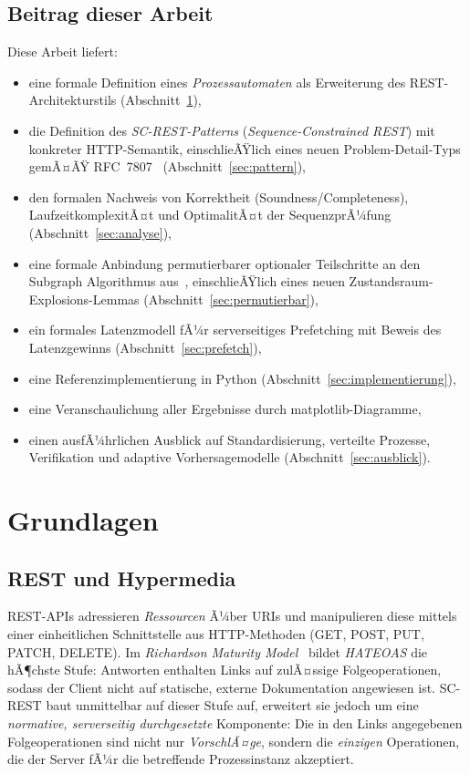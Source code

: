﻿\documentclass[a4paper,12pt]{article}
\theoremstyle{definition}
\begin{document}
\subsection{Beitrag dieser Arbeit}

Diese Arbeit liefert:
\begin{itemize}
	\item eine formale Definition eines \emph{Prozessautomaten} als Erweiterung des
	      REST-Architekturstils (Abschnitt~\ref{sec:grundlagen}),
	\item die Definition des \emph{SC-REST-Patterns} (\emph{Sequence-Constrained REST})
	      mit konkreter HTTP-Semantik, einschlieÃŸlich eines neuen Problem-Detail-Typs
	      gemÃ¤ÃŸ RFC~7807~\cite{rfc7807} (Abschnitt~\ref{sec:pattern}),
	\item den formalen Nachweis von Korrektheit (Soundness/Completeness),
	      LaufzeitkomplexitÃ¤t und OptimalitÃ¤t der SequenzprÃ¼fung
	      (Abschnitt~\ref{sec:analyse}),
	\item eine formale Anbindung permutierbarer optionaler Teilschritte an den Subgraph
	      Algorithmus aus~\cite{epp2026subgraph}, einschlieÃŸlich eines neuen
	      Zustandsraum-Explosions-Lemmas (Abschnitt~\ref{sec:permutierbar}),
	\item ein formales Latenzmodell fÃ¼r serverseitiges Prefetching mit Beweis des
	      Latenzgewinns (Abschnitt~\ref{sec:prefetch}),
	\item eine Referenzimplementierung in Python (Abschnitt~\ref{sec:implementierung}),
	\item eine Veranschaulichung aller Ergebnisse durch matplotlib-Diagramme,
	\item einen ausfÃ¼hrlichen Ausblick auf Standardisierung, verteilte Prozesse,
	      Verifikation und adaptive Vorhersagemodelle (Abschnitt~\ref{sec:ausblick}).
\end{itemize}

\section{Grundlagen}
\label{sec:grundlagen}

\subsection{REST und Hypermedia}

REST-APIs adressieren \emph{Ressourcen} Ã¼ber URIs und manipulieren diese mittels einer
einheitlichen Schnittstelle aus HTTP-Methoden (GET, POST, PUT, PATCH, DELETE). Im
\emph{Richardson Maturity Model}~\cite{fowler2010} bildet \emph{HATEOAS} die hÃ¶chste Stufe:
Antworten enthalten Links auf zulÃ¤ssige Folgeoperationen, sodass der Client nicht auf
statische, externe Dokumentation angewiesen ist. SC-REST baut unmittelbar auf dieser Stufe
auf, erweitert sie jedoch um eine \emph{normative, serverseitig durchgesetzte} Komponente:
Die in den Links angegebenen Folgeoperationen sind nicht nur \emph{VorschlÃ¤ge}, sondern die
\emph{einzigen} Operationen, die der Server fÃ¼r die betreffende Prozessinstanz akzeptiert.
\end{document}
